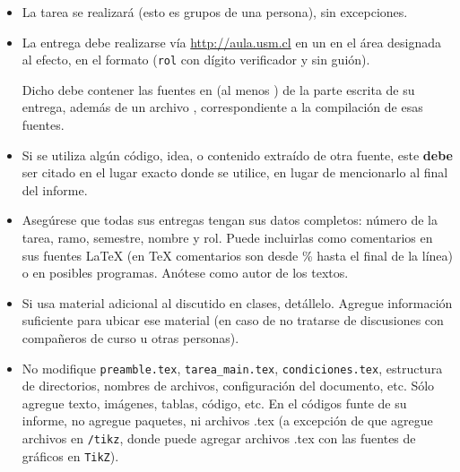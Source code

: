   \begin{itemize}
  \item
    La tarea se realizará 
    (esto es grupos de una persona),
    sin excepciones.
  \item
    La entrega debe realizarse vía \url{http://aula.usm.cl}
    en un  en el área designada al efecto,
    en el formato 
    (\texttt{rol} con dígito verificador y sin guión).

    Dicho  debe contener las fuentes en \LaTeXe{}
    (al menos )
    de la parte escrita de su entrega,
    además de un archivo ,
    correspondiente a la compilación de esas fuentes.
  \item Si se utiliza algún código, idea, o contenido extraído de otra fuente, este \textbf{debe} ser citado en el lugar exacto donde se utilice, en lugar de mencionarlo al final del informe. 
  \item
    Asegúrese que todas sus entregas tengan sus datos completos:
    número de la tarea, ramo, semestre, nombre y rol.
    Puede incluirlas como comentarios en sus fuentes \LaTeX{}
    (en \TeX{} comentarios son desde \% hasta el final de la línea)
    o en posibles programas.
    Anótese como autor de los textos.
 
  \item
    Si usa material adicional al discutido en clases,
    detállelo.
    Agregue información suficiente para ubicar ese material
    (en caso de no tratarse de discusiones con compañeros de curso
     u otras personas).
  \item No modifique \texttt{preamble.tex}, \texttt{tarea\_main.tex}, \texttt{condiciones.tex}, estructura de directorios, nombres de archivos, configuración del documento, etc. Sólo agregue texto, imágenes, tablas, código, etc. En el códigos funte de su informe, no agregue paquetes, ni archivos .tex (a excepción de que agregue archivos en \texttt{/tikz}, donde puede agregar archivos .tex con las fuentes de gráficos en \texttt{TikZ}).


\end{itemize}
